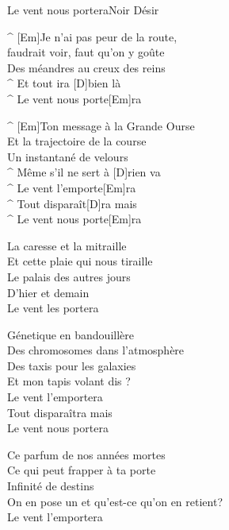 \begin{song}{Le vent nous portera}{Noir Désir}

\begin{guitar}
^ [Em]Je n'ai pas peur de la route, \\
faudrait voir, faut qu'on y goûte\\
Des méandres au creux des reins\\
^ Et tout ira [D]bien là\\
^ Le vent nous porte[Em]ra\\
\end{guitar}


\begin{guitar}
^ [Em]Ton message à la Grande Ourse\\
Et la trajectoire de la course\\
Un instantané de velours\\
^ Même s'il ne sert à [D]rien va\\
^ Le vent l'emporte[Em]ra\\
^ Tout disparaît[D]ra mais\\
^ Le vent nous porte[Em]ra\\
\end{guitar}


\begin{guitar}
La caresse et la mitraille\\
Et cette plaie qui nous tiraille\\
Le palais des autres jours\\
D'hier et demain\\
Le vent les portera\\
\end{guitar}

\begin{guitar}
Génetique en bandouillère\\
Des chromosomes dans l'atmosphère\\
Des taxis pour les galaxies\\
Et mon tapis volant dis ?\\
Le vent l'emportera\\
Tout disparaîtra mais\\
Le vent nous portera\\
\end{guitar}


\begin{guitar}
Ce parfum de nos années mortes\\
Ce qui peut frapper à ta porte\\
Infinité de destins\\
On en pose un et qu'est-ce qu'on en retient?\\
Le vent l'emportera\\
\end{guitar}


\end{song}
